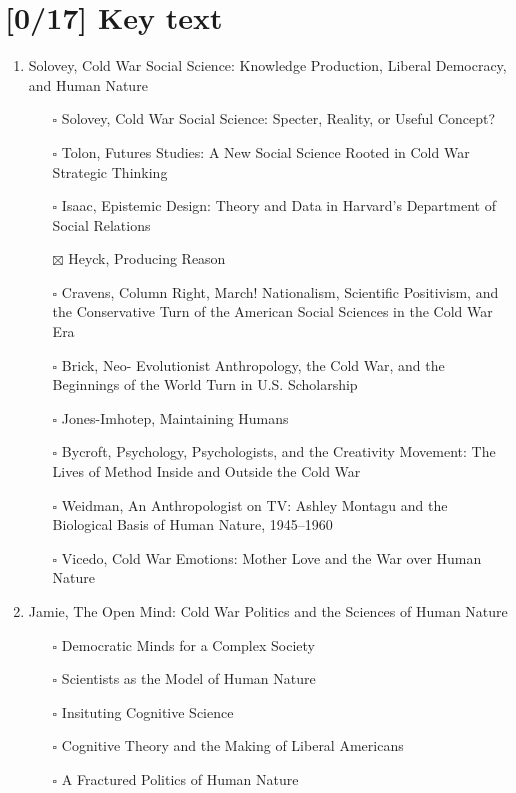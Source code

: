 \documentclass[paper=B6,portrait,twoside=true,twocolumn=false,headinclude=true,footinclude=false,fontsize=12,BCOR=10mm,DIV=calc,pagesize=auto,titlepage=firstiscover,mpinclude=false,headings=normal,headings=twolinechapter,open=right,toc=graduated,chapterprefix=false,numbers=endperiod,parskip=half+]{scrbook}
\theoremstyle{definition}
\begin{document}
\section{[0/17] Key text}
\label{sec:org52e59ff}
\begin{enumerate}
\item\relax [1/10] Solovey, Cold War Social Science: Knowledge Production, Liberal
Democracy, and Human Nature
\begin{itemize}
\item[{$\square$}] Solovey, Cold War Social Science: Specter, Reality, or Useful Concept?
\item[{$\square$}] Tolon, Futures Studies: A New Social Science Rooted in Cold War Strategic Thinking
\item[{$\square$}] Isaac, Epistemic Design: Theory and Data in Harvard’s Department of Social Relations
\item[{$\boxtimes$}] Heyck, Producing Reason
\item[{$\square$}] Cravens, Column Right, March! Nationalism, Scientific Positivism, and the Conservative Turn of the American Social Sciences in the Cold War Era
\item[{$\square$}] Brick, Neo- Evolutionist Anthropology, the Cold War, and the Beginnings of the World Turn in U.S. Scholarship
\item[{$\square$}] Jones-Imhotep, Maintaining Humans
\item[{$\square$}] Bycroft, Psychology, Psychologists, and the Creativity Movement: The Lives of Method Inside and Outside the Cold War
\item[{$\square$}] Weidman, An Anthropologist on TV: Ashley Montagu and the Biological
Basis of Human Nature, 1945–1960
\item[{$\square$}] Vicedo, Cold War Emotions: Mother Love and the War over Human Nature
\end{itemize}
\item\relax [0/5] Jamie, The Open Mind: Cold War Politics and the Sciences of Human
Nature
\begin{itemize}
\item[{$\square$}] Democratic Minds for a Complex Society
\item[{$\square$}] Scientists as the Model of Human Nature
\item[{$\square$}] Insituting Cognitive Science
\item[{$\square$}] Cognitive Theory and the Making of Liberal Americans
\item[{$\square$}] A Fractured Politics of Human Nature

\end{itemize}
\end{enumerate}
\end{document}

